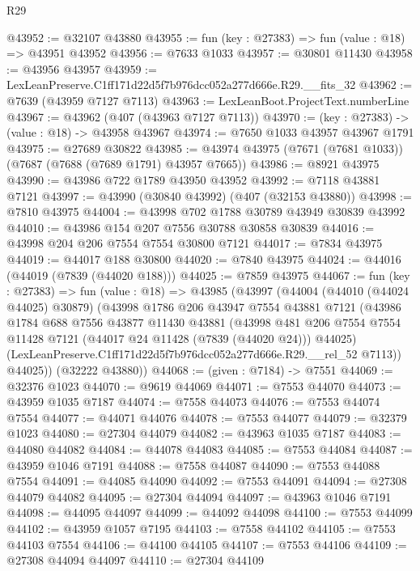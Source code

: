 \begin{lexlean}{R29}
\begin{coremodule}
@43952 := @32107 @43880
@43955 := fun (key : @27383) => fun (value : @18) => @43951 @43952
@43956 := @7633 @1033
@43957 := @30801 @11430
@43958 := @43956 @43957
@43959 := LexLeanPreserve.C1ff171d22d5f7b976dcc052a277d666e.R29.__fits_32
@43962 := @7639 (@43959 @7127 @7113)
@43963 := LexLeanBoot.ProjectText.numberLine
@43967 := @43962 (@407 (@43963 @7127 @7113))
@43970 := (key : @27383) -> (value : @18) -> @43958 @43967
@43974 := @7650 @1033 @43957 @43967 @1791
@43975 := @27689 @30822
@43985 := @43974 @43975 (@7671 (@7681 @1033)) (@7687 (@7688 (@7689 @1791) @43957 @7665))
@43986 := @8921 @43975
@43990 := @43986 @722 @1789 @43950 @43952
@43992 := @7118 @43881 @7121
@43997 := @43990 (@30840 @43992) (@407 (@32153 @43880))
@43998 := @7810 @43975
@44004 := @43998 @702 @1788 @30789 @43949 @30839 @43992
@44010 := @43986 @154 @207 @7556 @30788 @30858 @30839
@44016 := @43998 @204 @206 @7554 @7554 @30800 @7121
@44017 := @7834 @43975
@44019 := @44017 @188 @30800
@44020 := @7840 @43975
@44024 := @44016 (@44019 (@7839 (@44020 @188)))
@44025 := @7859 @43975
@44067 := fun (key : @27383) =>
  fun (value : @18) =>
  @43985
    (@43997
      (@44004
        (@44010 (@44024 @44025) @30879)
        (@43998
          @1786
          @206
          @43947
          @7554
          @43881
          @7121
          (@43986
            @1784
            @688
            @7556
            @43877
            @11430
            @43881
            (@43998
              @481
              @206
              @7554
              @7554
              @11428
              @7121
              (@44017 @24 @11428 (@7839 (@44020 @24)))
              @44025)
            (LexLeanPreserve.C1ff171d22d5f7b976dcc052a277d666e.R29.__rel_52 @7113))
          @44025))
      (@32222 @43880))
@44068 := (given : @7184) -> @7551
@44069 := @32376 @1023
@44070 := @9619 @44069
@44071 := @7553 @44070
@44073 := @43959 @1035 @7187
@44074 := @7558 @44073
@44076 := @7553 @44074 @7554
@44077 := @44071 @44076
@44078 := @7553 @44077
@44079 := @32379 @1023
@44080 := @27304 @44079
@44082 := @43963 @1035 @7187
@44083 := @44080 @44082
@44084 := @44078 @44083
@44085 := @7553 @44084
@44087 := @43959 @1046 @7191
@44088 := @7558 @44087
@44090 := @7553 @44088 @7554
@44091 := @44085 @44090
@44092 := @7553 @44091
@44094 := @27308 @44079 @44082
@44095 := @27304 @44094
@44097 := @43963 @1046 @7191
@44098 := @44095 @44097
@44099 := @44092 @44098
@44100 := @7553 @44099
@44102 := @43959 @1057 @7195
@44103 := @7558 @44102
@44105 := @7553 @44103 @7554
@44106 := @44100 @44105
@44107 := @7553 @44106
@44109 := @27308 @44094 @44097
@44110 := @27304 @44109

\end{coremodule}
\end{lexlean}
